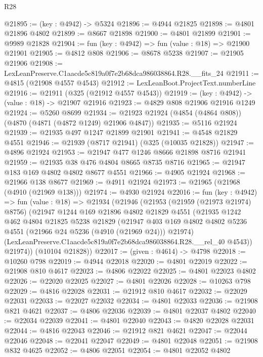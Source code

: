 \begin{lexlean}{R28}
\begin{coremodule}
@21895 := (key : @4942) -> @5324
@21896 := @4944 @21825
@21898 := @4801 @21896 @4802
@21899 := @8667 @21898
@21900 := @4801 @21899
@21901 := @9989 @21828
@21904 := fun (key : @4942) => fun (value : @18) => @21900 @21901
@21905 := @4812 @808
@21906 := @8678 @5238
@21907 := @21905 @21906
@21908 := LexLeanPreserve.C1aacde5c819a0f7e2b68dca986038864.R28.__fits_24
@21911 := @4815 (@21908 @4557 @4543)
@21912 := LexLeanBoot.ProjectText.numberLine
@21916 := @21911 (@325 (@21912 @4557 @4543))
@21919 := (key : @4942) -> (value : @18) -> @21907 @21916
@21923 := @4829 @808 @21906 @21916 @1249
@21924 := @5260 @8699
@21934 := @21923 @21924 (@4854 (@4864 @808)) (@4870 (@4871 (@4872 @1249) @21906 @4847))
@21935 := @5116 @21924
@21939 := @21935 @497 @1247 @21899 @21901
@21941 := @4548 @21829 @4551
@21946 := @21939 (@8717 @21941) (@325 (@10035 @21828))
@21947 := @4896 @21924
@21953 := @21947 @477 @1246 @8666 @21898 @8716 @21941
@21959 := @21935 @38 @476 @4804 @8665 @8735 @8716
@21965 := @21947 @183 @169 @4802 @4802 @8677 @4551
@21966 := @4905 @21924
@21968 := @21966 @138 @8677
@21969 := @4911 @21924
@21973 := @21965 (@21968 (@4910 (@21969 @138)))
@21974 := @4930 @21924
@22016 := fun (key : @4942) =>
  fun (value : @18) =>
  @21934
    (@21946
      (@21953
        (@21959 (@21973 @21974) @8756)
        (@21947
          @1244
          @169
          @21896
          @4802
          @21829
          @4551
          (@21935
            @1242
            @462
            @4804
            @21825
            @5238
            @21829
            (@21947
              @403
              @169
              @4802
              @4802
              @5236
              @4551
              (@21966 @24 @5236 (@4910 (@21969 @24)))
              @21974)
            (LexLeanPreserve.C1aacde5c819a0f7e2b68dca986038864.R28.__rel_40 @4543))
          @21974))
      (@10104 @21828))
@22017 := (given : @4614) -> @4798
@22018 := @10260 @798
@22019 := @4944 @22018
@22020 := @4801 @22019
@22022 := @21908 @810 @4617
@22023 := @4806 @22022
@22025 := @4801 @22023 @4802
@22026 := @22020 @22025
@22027 := @4801 @22026
@22028 := @10263 @798
@22029 := @4816 @22028
@22031 := @21912 @810 @4617
@22032 := @22029 @22031
@22033 := @22027 @22032
@22034 := @4801 @22033
@22036 := @21908 @821 @4621
@22037 := @4806 @22036
@22039 := @4801 @22037 @4802
@22040 := @22034 @22039
@22041 := @4801 @22040
@22043 := @4820 @22028 @22031
@22044 := @4816 @22043
@22046 := @21912 @821 @4621
@22047 := @22044 @22046
@22048 := @22041 @22047
@22049 := @4801 @22048
@22051 := @21908 @832 @4625
@22052 := @4806 @22051
@22054 := @4801 @22052 @4802

\end{coremodule}
\end{lexlean}
